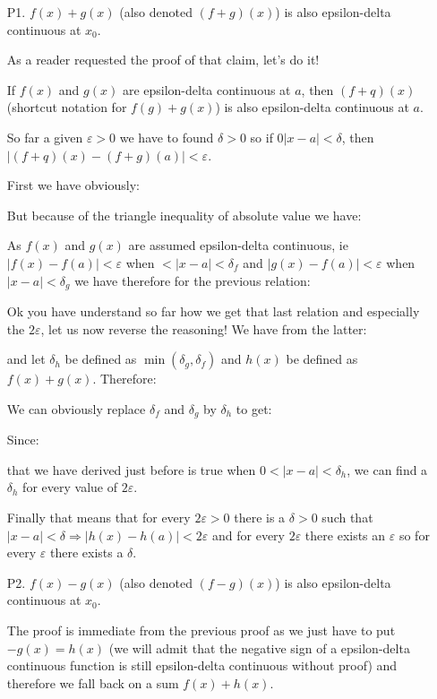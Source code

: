 	\begin{enumerate}
		\item[P1.] $f(x)+g(x)$ (also denoted $(f+g)(x)$) is also epsilon-delta  continuous at $x_0$.
		
		As a reader requested the proof of that claim, let's do it!
		
		If $f(x)$ and $g(x)$ are epsilon-delta continuous at $a$, then $(f+q)(x)$ (shortcut notation for $f(g)+g(x)$) is also epsilon-delta continuous at $a$. 
	 
		 So far a given $\varepsilon>0$ we have to found $\delta>0$ so if $0|x-a|<\delta$, then $|(f+q)(x)-(f+g)(a)|<\varepsilon$.
		 
		First we have obviously:
		
		But because of the triangle inequality of absolute value we have:
		
		As $f(x)$ and $g(x)$ are assumed epsilon-delta continuous, ie $|f(x)-f(a)|<\varepsilon$ when $<|x-a|<\delta_f$ and $|g(x)-f(a)|<\varepsilon$ when $|x-a|<\delta_g$ we have therefore for the previous relation:
		
		Ok you have understand so far how we get that last relation and especially the $2\varepsilon$, let us now reverse the reasoning! We have from the latter:
		
		and let $\delta_h$ be defined as $\min \left(\delta_g, \delta_f\right)$ and $h(x)$ be defined as $f(x)+g(x)$. Therefore:
		
		We can obviously replace $\delta_f$ and $\delta_g$ by $\delta_h$ to get:
		
		Since: 
		
		that we have derived just before is true when $0<|x-a|<\delta_h$, we can find a $\delta_h$ for every value of $2 \varepsilon$.
		
		Finally that means that for every $2 \varepsilon>0$ there is a $\delta>0$ such that $|x-a|<\delta \Longrightarrow|h(x)-h(a)|<2 \varepsilon$ and for every $2 \varepsilon$ there exists an $\varepsilon$ so for every $\varepsilon$ there exists a $\delta$.
		
		\item[P2.] $f(x)-g(x)$ (also denoted $(f-g)(x)$) is also epsilon-delta continuous at $x_0$.
		
		The proof is immediate from the previous proof as we just have to put $-g(x)=h(x)$ (we will admit that the negative sign of a epsilon-delta continuous function is still epsilon-delta continuous without proof) and therefore we fall back on a sum $f(x)+h(x)$.
		

\end{enumerate}
